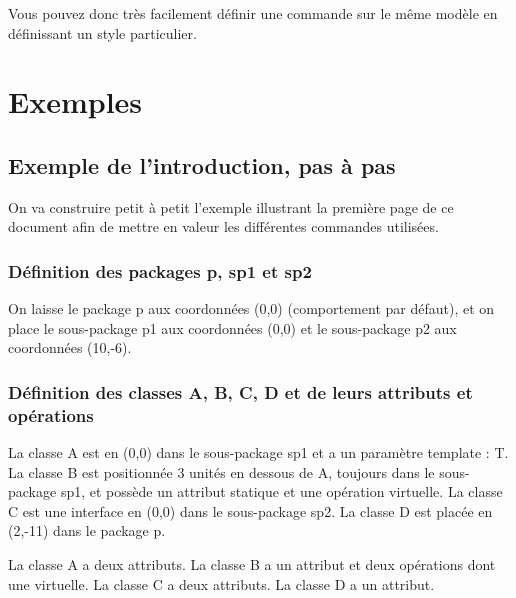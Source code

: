 \documentclass[a4paper,11pt]{report}
\newcommand{\inputTikZ}[1]{%
  }%
\newcommand{\inputTikZ}[1]{%
    \texttt{[image: fig/\#1.pdf]}%
  }%
\begin{document}
Vous pouvez donc très facilement définir une commande sur le même modèle en définissant un style particulier.

\section{Exemples}

\subsection{Exemple de l'introduction, pas à pas}

On va construire petit à petit l'exemple illustrant la première page de ce document afin de mettre en valeur les différentes commandes utilisées.

\subsubsection{Définition des packages p, sp1 et sp2}

On laisse le package p aux coordonnées (0,0) (comportement par défaut), et on place le sous-package p1 aux coordonnées (0,0) et le sous-package p2 aux coordonnées (10,-6).

{\color{red!70!black}
\vspace{-0.4cm}
\vspace{-0.4cm}
\vspace{-0.4cm}

}

\begin{center}
\inputTikZ{figure32}
\end{center}

\subsubsection{Définition des classes A, B, C, D et de leurs attributs et opérations}

La classe A est en (0,0) dans le sous-package sp1 et a un paramètre template : T. La classe B est positionnée 3 unités en dessous de A, toujours dans le sous-package sp1, et  possède un attribut statique et une opération virtuelle. La classe C est une interface en (0,0) dans le sous-package sp2. La classe D est placée en (2,-11) dans le package p.

La classe A a deux attributs. La classe B a un attribut et deux opérations dont une virtuelle. La classe C a deux attributs. La classe D a un attribut.
\end{document}
